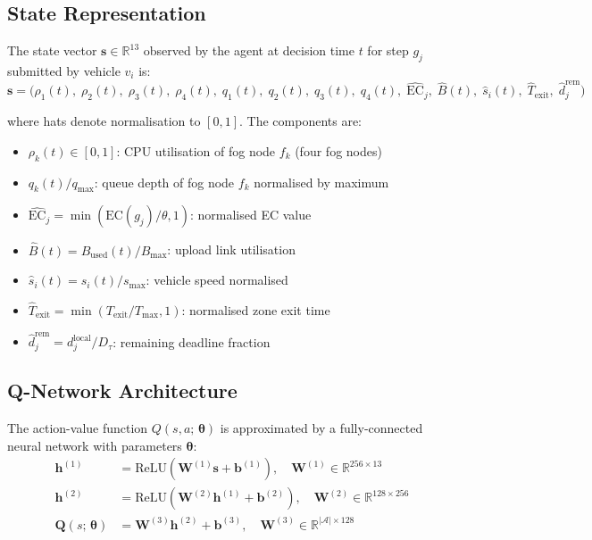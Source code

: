\documentclass[12pt,a4paper]{article}
\theoremstyle{definition}
\theoremstyle{remark}
\begin{document}
\subsection{State Representation}

The state vector $\mathbf{s} \in \mathbb{R}^{13}$ observed by the agent
at decision time $t$ for step $g_j$ submitted by vehicle $v_i$ is:
\begin{equation}
  \mathbf{s} = \bigl(
    \rho_1(t),\; \rho_2(t),\; \rho_3(t),\; \rho_4(t),\;
    q_1(t),\; q_2(t),\; q_3(t),\; q_4(t),\;
    \widehat{\mathrm{EC}}_j,\; \widehat{B}(t),\;
    \widehat{s}_i(t),\; \widehat{T}_{\text{exit}},\;
    \widehat{d}_j^{\text{rem}}
  \bigr)
  \label{eq:state}
\end{equation}

where hats denote normalisation to $[0,1]$. The components are:
\begin{itemize}[leftmargin=2em]
  \item $\rho_k(t) \in [0,1]$: CPU utilisation of fog node $f_k$ (four fog nodes)
  \item $q_k(t) / q_{\max}$: queue depth of fog node $f_k$ normalised by maximum
  \item $\widehat{\mathrm{EC}}_j = \min(\mathrm{EC}(g_j) / \theta, 1)$: normalised EC value
  \item $\widehat{B}(t) = B_{\text{used}}(t) / B_{\max}$: upload link utilisation
  \item $\widehat{s}_i(t) = s_i(t) / s_{\max}$: vehicle speed normalised
  \item $\widehat{T}_{\text{exit}} = \min(T_{\text{exit}} / T_{\max}, 1)$: normalised zone exit time
  \item $\widehat{d}_j^{\text{rem}} = d_j^{\text{local}} / D_\tau$: remaining deadline fraction
\end{itemize}

\subsection{Q-Network Architecture}

The action-value function $Q(s, a;\, \bm{\theta})$ is approximated by a
fully-connected neural network with parameters $\bm{\theta}$:
\begin{align}
  \bm{h}^{(1)} &= \mathrm{ReLU}\!\left(\bm{W}^{(1)} \mathbf{s} + \bm{b}^{(1)}\right),
    \quad \bm{W}^{(1)} \in \mathbb{R}^{256 \times 13}
    \label{eq:layer1}\\
  \bm{h}^{(2)} &= \mathrm{ReLU}\!\left(\bm{W}^{(2)} \bm{h}^{(1)} + \bm{b}^{(2)}\right),
    \quad \bm{W}^{(2)} \in \mathbb{R}^{128 \times 256}
    \label{eq:layer2}\\
  \bm{Q}(s;\,\bm{\theta}) &= \bm{W}^{(3)} \bm{h}^{(2)} + \bm{b}^{(3)},
    \quad \bm{W}^{(3)} \in \mathbb{R}^{|\mathcal{A}| \times 128}
    \label{eq:output}
\end{align}
\end{document}
